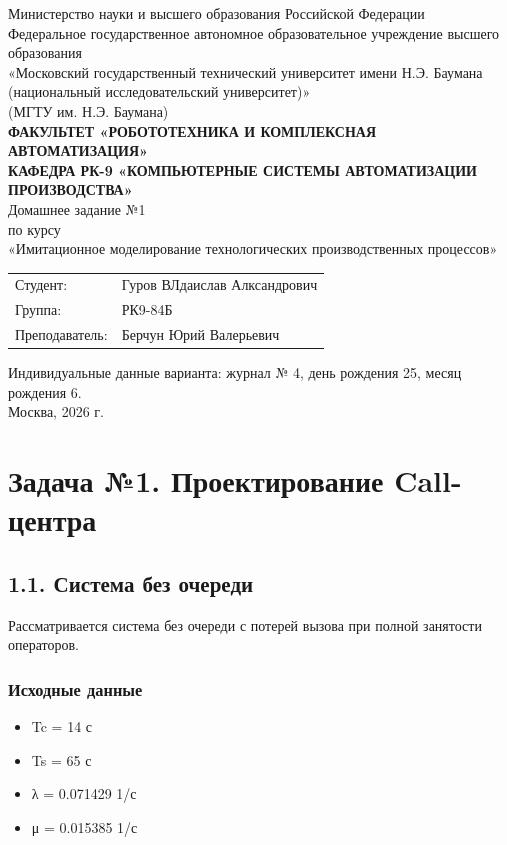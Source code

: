 \documentclass[12pt,a4paper]{article}
\begin{document}
\begin{titlepage}
\begin{center}
{\small Министерство науки и высшего образования Российской Федерации\\Федеральное государственное автономное образовательное учреждение высшего образования\\«Московский государственный технический университет имени Н.Э. Баумана\\(национальный исследовательский университет)»\\(МГТУ им. Н.Э. Баумана)}\\[0.8cm]
{\bfseries ФАКУЛЬТЕТ «РОБОТОТЕХНИКА И КОМПЛЕКСНАЯ АВТОМАТИЗАЦИЯ»}\\[0.25cm]
{\bfseries КАФЕДРА РК-9 «КОМПЬЮТЕРНЫЕ СИСТЕМЫ АВТОМАТИЗАЦИИ ПРОИЗВОДСТВА»}\\[1.6cm]
{\large Домашнее задание №1}\\[0.2cm]
{\normalsize по курсу}\\[0.2cm]
{\large «Имитационное моделирование технологических производственных процессов»}\\[1.8cm]
\begin{flushright}
\begin{tabular}{@{}p{3.6cm}p{8.4cm}@{}}
Студент: & Гуров ВЛдаислав Алксандрович\\
Группа: & РК9-84Б\\
Преподаватель: & Берчун Юрий Валерьевич
\end{tabular}
\end{flushright}
\vfill
{\normalsize Индивидуальные данные варианта: журнал № 4, день рождения 25, месяц рождения 6.}\\[1.2cm]
Москва, 2026 г.
\end{center}
\end{titlepage}

\section*{Задача №1. Проектирование Call-центра}
\subsection*{1.1. Система без очереди}
Рассматривается система без очереди с потерей вызова при полной занятости операторов.

\subsubsection*{Исходные данные}
\begin{itemize}
    \item Tc = 14 с
    \item Ts = 65 с
    \item λ = 0.071429 1/с
    \item μ = 0.015385 1/с
\end{itemize}
\end{document}
